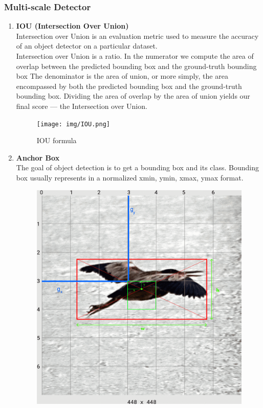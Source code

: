         \subsubsection{Multi-scale Detector}
            \begin{enumerate}
                \item \textbf{IOU (Intersection Over Union)} \\
                \vspace{3mm}
                Intersection over Union is an evaluation metric used to measure the accuracy of an object detector on a particular dataset. \\
                \vspace{3mm}
                Intersection over Union is a ratio. In the numerator we compute the area of overlap between the predicted bounding box and the ground-truth bounding box The denominator is the area of union, or more simply, the area encompassed by both the predicted bounding box and the ground-truth bounding box. Dividing the area of overlap by the area of union yields our final score — the Intersection over Union. \\
                \vspace{3mm}
                \begin{figure}[H]
                    \centering
                    \texttt{[image: img/IOU.png]}
                    \caption{IOU formula}
                \end{figure}
                \item \textbf{Anchor Box} \\
                \vspace{3mm}
                The goal of object detection is to get a bounding box and its class. Bounding box usually represents in a normalized xmin, ymin, xmax, ymax format. \\ 
                \vspace{3mm}
                \begin{figure}[H]
                    \centering
                    \includegraphics[width=0.6\linewidth]{img/bird.png}

\end{figure}
\end{enumerate}
